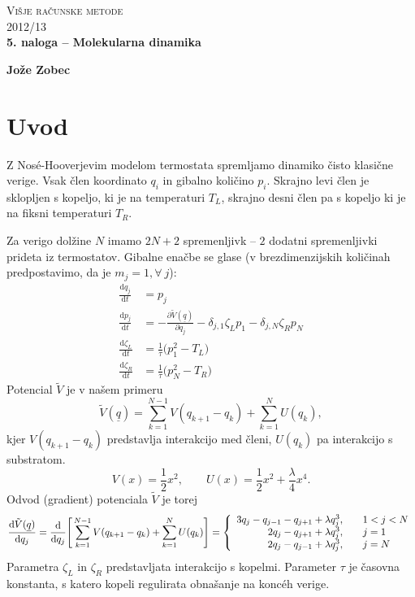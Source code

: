 \documentclass[a4 paper, 12pt]{article}
\begin{document}
\begin{center}
\textsc{Višje računske metode}\\
\textsc{2012/13}\\[0.5cm]
\textbf{5. naloga -- Molekularna dinamika}
\end{center}
\begin{flushright}
\textbf{Jože Zobec}
\end{flushright}

\newcommand{\e}{
	\ensuremath{\text{e}}
}

\renewcommand{\d}{
	\ensuremath{\text{d}}
}

\section{Uvod}

Z Nosé-Hooverjevim modelom termostata spremljamo dinamiko čisto klasi\v cne verige. Vsak člen koordinato $q_i$ in gibalno
koli\v cino $p_i$. Skrajno levi člen je sklopljen s kopeljo, ki je na temperaturi $T_L$, skrajno desni člen pa s kopeljo
ki je na fiksni temperaturi $T_R$.

Za verigo dol\v zine $N$ imamo $2N + 2$ spremenljivk -- $2$ dodatni spremenljivki prideta iz termostatov. Gibalne ena\v cbe se
glase (v brezdimenzijskih koli\v cinah predpostavimo, da je $m_j = 1, \forall\ j$):
\begin{align*}
	\frac{\d q_j}{\d t} &= p_j \\
	\frac{\d p_j}{\d t} &= - \frac{\partial \tilde{V}(\underline{q})}{\partial q_j} - \delta_{j,1}\zeta_L p_1 - \delta_{j,N} \zeta_R p_N \\
	\frac{\d \zeta_L}{\d t} &= \frac{1}{\tau} \bigg(p_1^2 - T_L\bigg) \\
	\frac{\d \zeta_R}{\d t} &= \frac{1}{\tau} \bigg(p_N^2 - T_R\bigg)
\end{align*}
Potencial $\tilde{V}$ je v našem primeru
\[
	\tilde{V}(\underline{q}) = \sum_{k = 1}^{N-1}V (q_{k+1} - q_k) + \sum_{k = 1}^N U (q_k),
\]
kjer $V(q_{k+1} - q_k)$ predstavlja interakcijo med členi, $U (q_k)$ pa interakcijo s substratom.
\[
	V(x) = \frac{1}{2}x^2, \qquad U(x) = \frac{1}{2}x^2 + \frac{\lambda}{4}x^4.
\]
Odvod (gradient) potenciala $\tilde{V}$ je torej
\[
	\frac{\d \tilde{V}(\underline{q})}{\d q_j} = \frac{\d}{\d q_j} \Bigg[\sum_{k = 1}^{N-1}V (q_{k+1} - q_k) +
		\sum_{k = 1}^N U (q_k)\Bigg] \\
	= \left\{
	\begin{array}{rl}
		3 q_j - q_{j-1} - q_{j+1} + \lambda q_j^3, &\quad 1 < j < N \\
		2 q_j - q_{j+1} + \lambda q_j^3, &\quad j = 1 \\
		2 q_j - q_{j-1} + \lambda q_j^3, &\quad j = N
	\end{array}\right.
\]
Parametra $\zeta_L$ in $\zeta_R$ predstavljata interakcijo s kopelmi. Parameter $\tau$ je časovna konstanta, s katero kopeli regulirata
obnašanje na koncéh verige.
\end{document}
